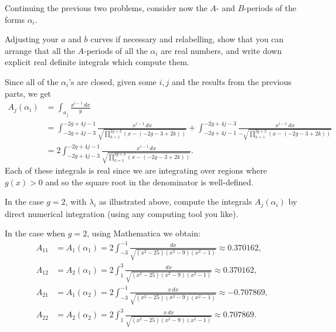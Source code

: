 \documentclass[expanded]{lkx_pset}
\begin{document}
\begin{problem}{4}
Continuing the previous two problems, consider now the $A$- and $B$-periods of the forms $\alpha_{i}$.
\end{problem}

\begin{parts}
	\begin{part}{}Adjusting your $a$ and $b$ curves if necessary and relabelling, show that you can arrange that all the $A$-periods of all the $\alpha_{i}$ are real numbers, and write down explicit real definite integrals which compute them.\medskip
	\end{part}

	Since all of the $\alpha_i$'s are closed, given some $i,j$ and the results from the previous parts, we get
	\[
		\begin{aligned}
			A_j(\alpha_i) & = \int_{a_j}\frac{x^{i-1}\, dx}{y}                                                                                                                                               \\
			              & = \int_{-2g+4j-3}^{-2g+4j-1}\frac{x^{i-1}\, dx}{\sqrt{\prod_{k=1}^{2g+2}(x-(-2g-3+2k))}}+\int_{-2g+4j-1}^{-2g+4j-3}\frac{x^{i-1}\, dx}{-\sqrt{\prod_{k=1}^{2g+2}(x-(-2g-3+2k))}} \\
			              & = 2\int_{-2g+4j-3}^{-2g+4j-1}\frac{x^{i-1}\, dx}{\sqrt{\prod_{k=1}^{2g+2}(x-(-2g-3+2k))}}.
		\end{aligned}
	\]
	Each of these integrals is real since we are integrating over regions where $g(x)>0$ and so the square root in the denominator is well-defined.

	\begin{part}{}
		In the case $g=2$, with $\lambda_{i}$ as illustrated above,
		compute the integrals $A_{j}(\alpha_{i})$ by direct numerical integration (using any computing tool you like).
	\end{part}
	In the case when $g=2$, using Mathematica we obtain:
	\[
		\begin{aligned}
			A_{11} & = A_1(\alpha_1)=2\int_{-3}^{-1}\frac{dx}{\sqrt{(x^2-25)(x^2-9)(x^2-1)}}\approx 0.370162,        \\
			A_{12} & = A_2(\alpha_1) =2\int_1^3 \frac{dx}{\sqrt{(x^2-25)(x^2-9)(x^2-1)}}\approx 0.370162,            \\
			A_{21} & = A_1(\alpha_2) = 2\int_{-3}^{-1}\frac{x\, dx}{\sqrt{(x^2-25)(x^2-9)(x^2-1)}}\approx -0.707869, \\
			A_{22} & = A_2(\alpha_2) =2\int_1^3 \frac{x\, dx}{\sqrt{(x^2-25)(x^2-9)(x^2-1)}}\approx 0.707869.
		\end{aligned}
	\]


\end{parts}
\end{document}

